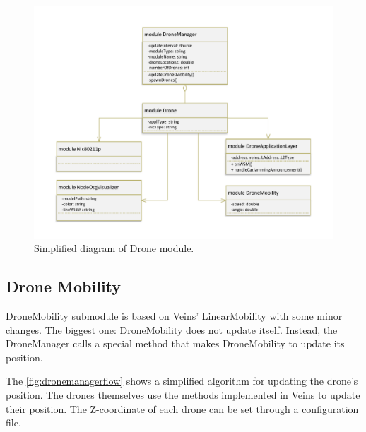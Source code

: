 \documentclass[]{nsm-thesis}
\begin{document}
\begin{figure}
	\centering
	\includegraphics[width=1\textwidth]{figures/Drone.pdf}
	\caption{Simplified diagram of Drone module.}
	\label{fig:dronened}
\end{figure}



\subsection{Drone Mobility}

DroneMobility submodule is based on Veins' LinearMobility with some minor changes. The biggest one: DroneMobility does not update itself. Instead, the DroneManager calls a special method that makes DroneMobility to update its position.

The \cref{fig:dronemanagerflow} shows a simplified algorithm for updating the drone's position. The drones themselves use the methods implemented in Veins to update their position. The Z-coordinate of each drone can be set through a configuration file.
\end{document}
